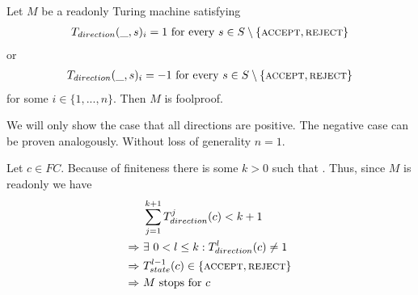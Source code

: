 \begin{Lemma} \label{turing_machines:lemma_foolproofness:lemma}
	Let $M$ be a readonly Turing machine satisfying
	\begin{align*}
		T_{direction} (\_,s)_i = 1~\text{for every}~ s \in S \setminus \{\text{\scshape{accept}},\text{\scshape{reject}}\}
	\end{align*}
	or
	\begin{align*}
		T_{direction} (\_,s)_i = -1~\text{for every}~ s \in S \setminus \{\text{\scshape{accept}},\text{\scshape{reject}}\}
	\end{align*}
	for some $i \in \{1,...,n\}$.
	Then $M$ is foolproof.
\end{Lemma}
\proof
We will only show the case that all directions are positive. The negative case can be proven analogously.
Without loss of generality $n=1$.

Let $c \in FC$. Because of finiteness there is some $k > 0$ such that .
Thus, since $M$ is readonly we have
\begin{align*}
	&\sum_{j=1}^{k+1} T_{direction}^j (c) < k+1 \\
	\Rightarrow~&\exists~0 < l \leq k: T_{direction}^l (c) \neq 1 \\
	\Rightarrow~&T_{state}^{l-1} (c) \in \{\text{\scshape{accept}},\text{\scshape{reject}}\} \\
	\Rightarrow~&M ~\text{stops for}~ c
\end{align*}
\endproof
